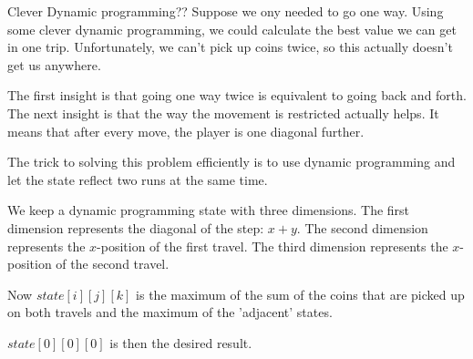 \documentclass{writeup}
\begin{document}
\begin{solutions}
  \begin{solution}{Clever Dynamic programming}{?}{?}
    Suppose we ony needed to go one way.
    Using some clever dynamic programming, we could calculate the best value we can get in one trip.
    Unfortunately, we can't pick up coins twice, so this actually doesn't get us anywhere.

    The first insight is that going one way twice is equivalent to going back and forth.
    The next insight is that the way the movement is restricted actually helps.
    It means that after every move, the player is one diagonal further.

    The trick to solving this problem efficiently is to use dynamic programming and let the state reflect two runs at the same time.

    We keep a dynamic programming state with three dimensions.
    The first dimension represents the diagonal of the step: $x + y$.
    The second dimension represents the $x$-position of the first travel.
    The third dimension represents the $x$-position of the second travel.

    Now $state[i][j][k]$ is the maximum of the sum of the coins that are picked up on both travels and the maximum of the 'adjacent' states.


    $state[0][0][0]$ is then the desired result.
  \end{solution}
\end{solutions}
\end{document}
